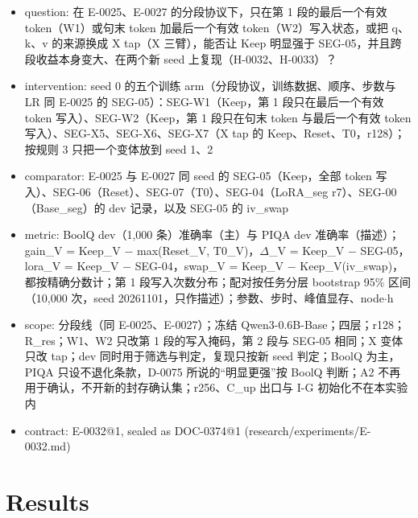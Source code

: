 \documentclass[11pt]{article}
\begin{document}
\begin{itemize}
\item question: 在 E-0025、E-0027 的分段协议下，只在第 1 段的最后一个有效 token（W1）或句末 token 加最后一个有效 token（W2）写入状态，或把 q、k、v 的来源换成 X tap（X 三臂），能否让 Keep 明显强于 SEG-05，并且跨段收益本身变大、在两个新 seed 上复现（H-0032、H-0033）？
\item intervention: seed 0 的五个训练 arm（分段协议，训练数据、顺序、步数与 LR 同 E-0025 的 SEG-05）：SEG-W1（Keep，第 1 段只在最后一个有效 token 写入）、SEG-W2（Keep，第 1 段只在句末 token 与最后一个有效 token 写入）、SEG-X5、SEG-X6、SEG-X7（X tap 的 Keep、Reset、T0，r128）；按规则 3 只把一个变体放到 seed 1、2
\item comparator: E-0025 与 E-0027 同 seed 的 SEG-05（Keep，全部 token 写入）、SEG-06（Reset）、SEG-07（T0）、SEG-04（LoRA\_seg r7）、SEG-00（Base\_seg）的 dev 记录，以及 SEG-05 的 iv\_swap
\item metric: BoolQ dev（1,000 条）准确率（主）与 PIQA dev 准确率（描述）；gain\_V = Keep\_V \ensuremath{-} max(Reset\_V, T0\_V)，\ensuremath{\Delta}\_V = Keep\_V \ensuremath{-} SEG-05，lora\_V = Keep\_V \ensuremath{-} SEG-04，swap\_V = Keep\_V \ensuremath{-} Keep\_V(iv\_swap)，都按精确分数计；第 1 段写入次数分布；配对按任务分层 bootstrap 95\% 区间（10,000 次，seed 20261101，只作描述）；参数、步时、峰值显存、node\ensuremath{\cdot}h
\item scope: 分段线（同 E-0025、E-0027）；冻结 Qwen3-0.6B-Base；四层；r128；R\_res；W1、W2 只改第 1 段的写入掩码，第 2 段与 SEG-05 相同；X 变体只改 tap；dev 同时用于筛选与判定，复现只按新 seed 判定；BoolQ 为主，PIQA 只设不退化条款，D-0075 所说的``明显更强''按 BoolQ 判断；A2 不再用于确认，不开新的封存确认集；r256、C\_up 出口与 I-G 初始化不在本实验内
\item contract: E-0032@1, sealed as DOC-0374@1 (research/experiments/E-0032.md)
\end{itemize}

\section{Results}
\end{document}
